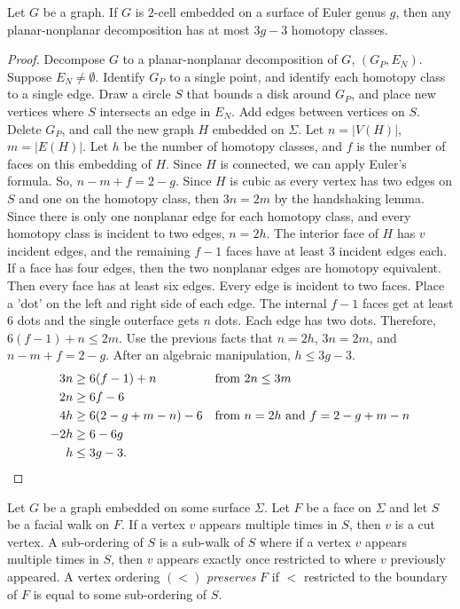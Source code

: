 \begin{lemma}
	Let $G$ be a graph. If \(G\) is \(2\)-cell embedded on a surface of Euler genus \(g\), then any planar-nonplanar decomposition has at most \(3g-3\) homotopy classes. 
\end{lemma}
\begin{proof}
	Decompose \(G\) to a planar-nonplanar decomposition of \(G\), \((G_P, E_N)\). Suppose \(E_N \neq \emptyset\). Identify \(G_P\) to a single point, and identify each homotopy class to a single edge. Draw a circle $S$ that bounds a disk around \(G_P\), and place new vertices where $S$ intersects an edge in $E_N$. Add edges between vertices on $S$. Delete \(G_P\), and call the new graph \(H\) embedded on $\Sigma$. Let \(n = |V(H)|\), \(m = |E(H)|\). Let \(h\) be the number of homotopy classes, and \(f\) is the number of faces on this embedding of $H$. Since $H$ is connected, we can apply Euler's formula. So, \(n - m + f = 2 - g\). Since \(H\) is cubic as every vertex has two edges on $S$ and one on the homotopy class, then \(3n = 2m\) by the handshaking lemma. Since there is only one nonplanar edge for each homotopy class, and every homotopy class is incident to two edges, \(n = 2h\). The interior face of \(H\) has \(v\) incident edges, and the remaining \(f-1\) faces have at least 3 incident edges each. If a face has four edges, then the two nonplanar edges are homotopy equivalent. Then every face has at least six edges. Every edge is incident to two faces. Place a 'dot' on the left and right side of each edge. The internal $f-1$ faces get at least $6$ dots and the single outerface gets $n$ dots. Each edge has two dots. Therefore, \(  6(f-1) + n \leq 2m \). Use the previous facts that $n = 2h$, $3n = 2m$, and $n - m + f = 2 - g$. After an algebraic manipulation, \(h \leq 3g - 3 \). 
	\begin{align*}
		3n  & \geq 6(f - 1) + n         && \text{from } 2n \leq 3m \\
		2n  & \geq 6f - 6               \\
		4h  & \geq 6(2 - g + m - n) - 6 && \text{from } n = 2h \text{ and } f = 2 - g + m - n\\
		-2h & \geq 6 - 6g               \\
		h   & \leq 3g - 3. 
		&&\mbox{}\hfill \qedhere
	\end{align*}
\end{proof}

Let \(G\) be a graph embedded on some surface $\Sigma$. Let $F$ be a face on $\Sigma$ and let $S$ be a facial walk on $F$. If a vertex $v$ appears multiple times in $S$, then $v$ is a cut vertex. A sub-ordering of $S$ is a sub-walk of $S$ where if a vertex $v$ appears multiple times in $S$, then $v$ appears exactly once restricted to where $v$ previously appeared. A vertex ordering \((<)\) \textit{preserves} \(F\) if $<$ restricted to the boundary of $F$ is equal to some sub-ordering of $S$.

